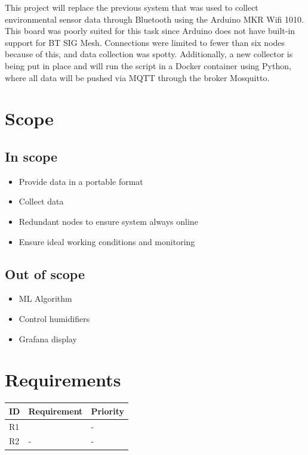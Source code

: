 \documentclass[11pt,letterpaper]{article}
\begin{document}
	This project will replace the previous system that was used to collect environmental sensor data through Bluetooth using the Arduino MKR Wifi 1010. This board was poorly suited for this task since Arduino does not have built-in support for BT SIG Mesh. Connections were limited to fewer than six nodes because of this, and data collection was spotty. Additionally, a new collector is being put in place and will run the script in a Docker container using Python, where all data will be pushed via MQTT through the broker Mosquitto.
	\section{Scope}
	
	\subsection{In scope}
	\begin{itemize}
		\item Provide data in a portable format
		\item Collect data
		\item Redundant nodes to ensure system always online
		\item Ensure ideal working conditions and monitoring
	\end{itemize}
	
	\subsection{Out of scope}
	\begin{itemize}
		\item ML Algorithm
		\item Control humidifiers
		\item Grafana display
	\end{itemize}
	
	\section{Requirements}
	
	\begin{tabularx}{\textwidth}{@{}l X l@{}}
		\toprule
		\textsf{\small ID} & \textsf{\small Requirement} & \textsf{\small Priority} \\
		\midrule
		R1 &  & - \\
		R2 & - & - \\
		\bottomrule
	\end{tabularx}
	
\end{document}
